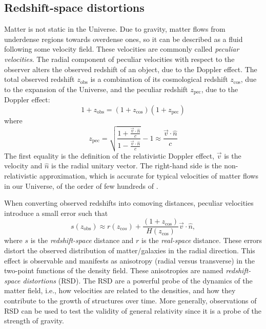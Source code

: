  

    \subsection{Redshift-space distortions}
    \label{intro:probes:rsd}

    Matter is not static in the Universe. 
    Due to gravity, matter flows from underdense regions towards overdense ones,
    so it can be described as a fluid following some velocity field. 
    These velocities are commonly called \emph{peculiar velocities}.
    The radial component of peculiar velocities with respect to the observer 
    alters the observed redshift of an object, due to the Doppler effect. 
    The total observed redshift $z_\mathrm{obs}$
    is a combination of its cosmological redshift $z_\mathrm{cos}$, 
    due to the expansion of the Universe,
    and the peculiar redshift $z_\mathrm{pec}$, due to the Doppler effect:
    \begin{equation}
        1 + z_\mathrm{obs} = (1 + z_\mathrm{cos})(1 + z_\mathrm{pec})
        \label{eq:observed_redshift}
    \end{equation}
    where
    \begin{equation}
        z_\mathrm{pec} = \sqrt{\frac{1 + \frac{\vec{v}\cdot \hat{n}}{c} }{1 - \frac{\vec{v}\cdot \hat{n}}{c}}} - 1
                        \approx \frac{\vec{v}\cdot \hat{n}}{c}
        \label{eq:peculiar_redshift}
    \end{equation}
    The first equality is the definition of the relativistic Doppler effect, 
    $\vec{v}$ is the velocity and $\hat{n}$ is the radial unitary vector.  
    The right-hand side is the non-relativistic approximation, which is accurate
    for typical velocities of matter flows in our Universe, of the order of few hundreds of \kms. 

    When converting observed redshifts into comoving distances, peculiar velocities
    introduce a small error such that 
    \begin{equation}
        s(z_\mathrm{obs}) \approx r(z_{\mathrm cos}) + \frac{(1+z_\mathrm{cos})}{H(z_\mathrm{cos})}\vec{v} \cdot \hat{n},
        \label{eq:redshift_space_distance}
    \end{equation}
    where $s$ is the \emph{redshift-space} distance and $r$ is the \emph{real-space} distance.
    These errors distort the observed distribution of matter/galaxies in the radial direction. 
    This effect is observable and manifests as anisotropy (radial versus transverse) 
    in the two-point functions of the density field.
    These anisotropies are named \emph{redshift-space distortions} (RSD). 
    The RSD are a powerful probe of the dynamics of the matter field, i.e., 
    how velocities are related to the densities, and how they contribute
    to the growth of structures over time. More generally, 
    observations of RSD can be used to test the validity of general 
    relativity since it is a probe of the strength of gravity. 

